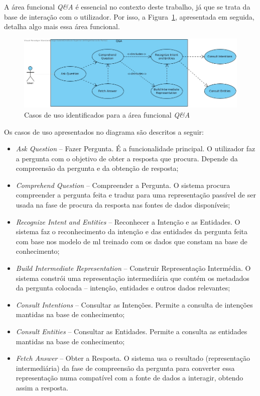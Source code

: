 A área funcional \textit{Q\&A} é essencial no contexto deste trabalho, já que se trata da base de interação com o utilizador. Por isso, a Figura~\ref{fig:detailed_use_cases}, apresentada em seguida, detalha algo mais essa área funcional.
%
\begin{figure}[!h]
    \centering
    \includegraphics[width=\textwidth]{ch04/assets/questions-use-cases.jpg}
    \caption{Casos de uso identificados para a área funcional \textit{Q\&A}}
    \label{fig:detailed_use_cases}
\end{figure}

Os casos de uso apresentados no diagrama são descritos a seguir:

\begin{itemize}
    \item 
    {
        \textit{Ask Question} -- Fazer Pergunta. É a funcionalidade principal. O utilizador faz a pergunta com o objetivo de obter a resposta que procura. Depende da compreensão da pergunta e da obtenção de resposta;
    }
    \item 
    {
        \textit{Comprehend Question} -- Compreender a Pergunta. O sistema procura compreender a pergunta feita e traduz para uma representação passível de ser usada na fase de procura da resposta nas fontes de dados disponíveis;
    }
    \item 
    {
        \textit{Recognize Intent and Entities} -- Reconhecer a Intenção e as Entidades. O sistema faz o reconhecimento da intenção e das entidades da pergunta feita com base nos modelo de \gls{ml} treinado com os dados que constam na base de conhecimento;
    }
    \item 
    {
        \textit{Build Intermediate Representation} -- Construir Representação Intermédia. O sistema constrói uma representação intermediária que contém os metadados da pergunta colocada -- intenção, entidades e outros dados relevantes;
    }
    \item 
    {
        \textit{Consult Intentions} -- Consultar as Intenções. Permite a consulta de intenções mantidas na base de conhecimento;
    }
    \item 
    {
        \textit{Consult Entities} -- Consultar as Entidades. Permite a consulta as entidades mantidas na base de conhecimento;
    }
    \item 
    {
        \textit{Fetch Answer} -- Obter a Resposta. O sistema usa o resultado (representação intermediária) da fase de compreensão da pergunta para converter essa representação numa compatível com a fonte de dados a interagir, obtendo assim a resposta.
    }
\end{itemize}

